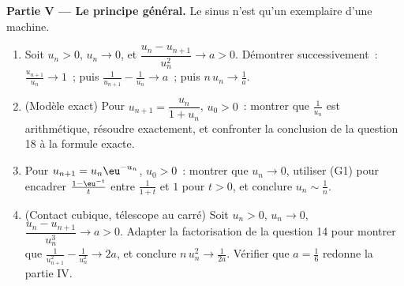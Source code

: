 \begin{problem}[{Devoir maison --- le \omterm{pb:b1:seq:1}{théorème de Cesàro--Stolz}
et l'asymptotique $u_n \sim \sqrt{3/n}$ pour $u_{n+1} = \sin
u_n$}]
\medskip
\noindent\textbf{Partie V --- Le principe général.} Le sinus n'est
qu'un exemplaire d'une machine.
\begin{enumerate}[resume]
  \item Soit $u_n > 0$, $u_n \to 0$, et $\dfrac{u_n -
        u_{n+1}}{u_n^{2}} \to a > 0$. Démontrer successivement~:
        $\frac{u_{n+1}}{u_n} \to 1$~; puis $\frac{1}{u_{n+1}} -
        \frac{1}{u_n} \to a$~; puis $n\,u_n \to \frac1a$.
  \item (Modèle exact) Pour $u_{n+1} = \dfrac{u_n}{1 + u_n}$, $u_0
        > 0$~: montrer que $\frac{1}{u_n}$ est arithmétique, résoudre
        exactement, et confronter la conclusion de la question 18 à la
        formule exacte.
  \item Pour $u_{n+1} = u_n \eu^{-u_n}$, $u_0 > 0$~: montrer que $u_n
        \to 0$, utiliser (G1) pour encadrer $\frac{1 - \eu^{-t}}{t}$
        entre $\frac{1}{1+t}$ et $1$ pour $t > 0$, et conclure $u_n
        \sim \frac 1n$.
  \item (Contact cubique, télescope au carré) Soit $u_n > 0$, $u_n
        \to 0$, $\dfrac{u_n - u_{n+1}}{u_n^{3}} \to a > 0$. Adapter
        la factorisation de la question 14 pour montrer que
        $\frac{1}{u_{n+1}^2} - \frac{1}{u_n^2} \to 2a$, et conclure
        $n\,u_n^{2} \to \frac{1}{2a}$. Vérifier que $a =
        \frac16$ redonne la partie IV.
\end{enumerate}


\end{problem}
